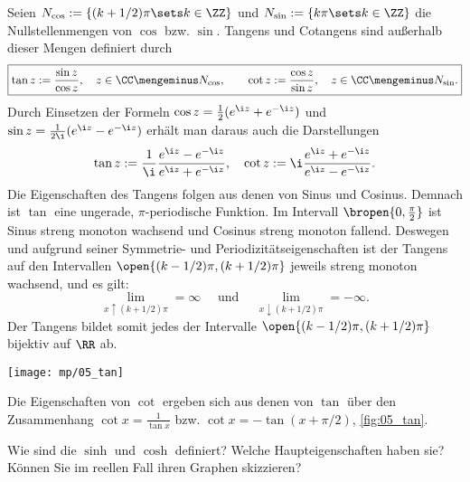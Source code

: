 \begin{antwort}
  Seien $N_{\cos} := \{ (k+1/2)\pi\sets k\in\ZZ \}$ und 
  $N_{\sin} := \{ k\pi\sets k\in\ZZ \}$ die Nullstellenmengen von $\cos$ 
  bzw. $\sin$. Tangens und Cotangens sind außerhalb dieser Mengen  
  definiert durch
  \[
  \boxed{
    \tan z := \frac{\sin z}{\cos z},\quad z\in 
    \CC\mengeminus N_{\cos},
    \qquad
    \cot z := \frac{\cos z}{\sin z},\quad z\in 
    \CC\mengeminus N_{\sin}. }
  \]
  Durch Einsetzen der Formeln $\cos z=\frac{1}{2}( e^{\i z}+e^{-\i z} )$ 
  und $\sin z=\frac{1}{2\i} ( e^{\i z}-e^{-\i z} )$ erhält man daraus auch die 
  Darstellungen 
  \[
  \tan z := \frac{1}{\i} \frac{e^{\i z}-e^{-\i z}}{e^{\i z}+e^{-\i z}}, \quad
  \cot z := \i \frac{e^{\i z}+e^{-\i z}}{e^{\i z}-e^{-\i z}}.
  \]
  Die Eigenschaften des Tangens folgen aus denen von Sinus und 
  Cosinus. Demnach ist $\tan$ eine ungerade, $\pi$-periodische Funktion. 
  Im Intervall $\bropen{ 0,\frac{\pi}{2} }$ ist Sinus streng monoton 
  wachsend und Cosinus streng monoton fallend. 
  Deswegen und aufgrund seiner Symmetrie- 
  und Periodizitätseigenschaften 
  ist der Tangens auf den Intervallen 
  $\open{ (k-1/2)\pi, (k+1/2)\pi }$ jeweils 
  streng monoton wachsend, und es gilt:
  \[
  \lim\limits_{x\uparrow (k+1/2)\pi }=\infty \quad\text{ und }\quad
  \lim\limits_{x\downarrow (k+1/2)\pi }=-\infty.
  \] 
  Der Tangens bildet somit jedes der Intervalle 
  $\open{ (k-1/2)\pi, (k+1/2)\pi }$ bijektiv auf $\RR$ ab.  

  \begin{center}
    \texttt{[image: mp/05\_tan]}
    \label{fig:05_tan}
  \end{center}

  Die Eigenschaften von $\cot$ ergeben sich aus denen von $\tan$ 
  über den Zusammenhang $\cot x=\frac{1}{\tan x}$ bzw. 
  $\cot x=-\tan(x+\pi/2)$, \sieheAbbildung\ref{fig:05_tan}.
  \AntEnd
\end{antwort}

\begin{frage}\label{05_sinh}
  Wie sind die  $\sinh$ und $\cosh$ 
  definiert? Welche Haupteigenschaften haben sie? Können Sie im reellen 
  Fall ihren Graphen skizzieren? 
\end{frage}

